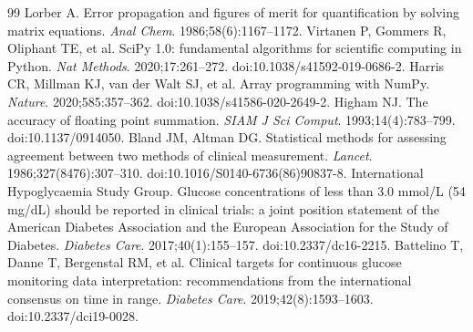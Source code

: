 \documentclass[11pt]{article}
\begin{document}
\begin{thebibliography}{99}
 Lorber A. Error propagation and figures of merit for quantification by solving matrix equations. \emph{Anal Chem}. 1986;58(6):1167--1172.
 Virtanen P, Gommers R, Oliphant TE, et al. SciPy 1.0: fundamental algorithms for scientific computing in Python. \emph{Nat Methods}. 2020;17:261--272. doi:10.1038/s41592-019-0686-2.
 Harris CR, Millman KJ, van der Walt SJ, et al. Array programming with NumPy. \emph{Nature}. 2020;585:357--362. doi:10.1038/s41586-020-2649-2.
 Higham NJ. The accuracy of floating point summation. \emph{SIAM J Sci Comput}. 1993;14(4):783--799. doi:10.1137/0914050.
 Bland JM, Altman DG. Statistical methods for assessing agreement between two methods of clinical measurement. \emph{Lancet}. 1986;327(8476):307--310. doi:10.1016/S0140-6736(86)90837-8.
 International Hypoglycaemia Study Group. Glucose concentrations of less than 3.0 mmol/L (54 mg/dL) should be reported in clinical trials: a joint position statement of the American Diabetes Association and the European Association for the Study of Diabetes. \emph{Diabetes Care}. 2017;40(1):155--157. doi:10.2337/dc16-2215.
 Battelino T, Danne T, Bergenstal RM, et al. Clinical targets for continuous glucose monitoring data interpretation: recommendations from the international consensus on time in range. \emph{Diabetes Care}. 2019;42(8):1593--1603. doi:10.2337/dci19-0028.
\end{thebibliography}

\end{document}
